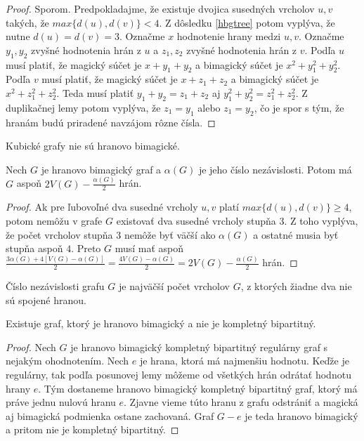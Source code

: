 \begin{proof} Sporom. Predpokladajme, že existuje dvojica susedných vrcholov $u,v$ takých, že $max \{d(u), d(v)\} < 4$. Z dôsledku \ref{hbgtree}  potom vyplýva, že nutne $d(u) = d(v) = 3$. Označme $x$ hodnotenie hrany medzi $u,v$. Označme $y_1, y_2$ zvyšné hodnotenia hrán z $u$ a $z_1, z_2$ zvyšné hodnotenia hrán z $v$. Podľa $u$ musí platiť, že magický súčet je $x + y_1 + y_2$ a bimagický súčet je $x^2 + y^2_1 + y^2_2$. Podľa $v$ musí platiť, že magický súčet je $x + z_1 + z_2$ a bimagický súčet je $x^2 + z^2_1 + z^2_2$. Teda musí platiť $y_1 + y_2 = z_1 + z_2$ aj $y^2_1 + y^2_2 = z^2_1 + z^2_2$. Z duplikačnej lemy potom vyplýva, že $z_1 = y_1$ alebo $z_1 = y_2$, čo je spor s tým, že hranám budú priradené navzájom rôzne čísla.
\end{proof} 

\begin{consequence} Kubické grafy nie sú hranovo bimagické.
\end{consequence}

\begin{consequence} Nech $G$ je hranovo bimagický graf a $\alpha (G)$ je jeho číslo nezávislosti. Potom má $G$ aspoň $2V(G) - \frac{\alpha (G)}{2}$ hrán.
\end{consequence}

\begin{proof} Ak pre ľubovoľné dva susedné vrcholy $u,v$ platí $max \{d(u), d(v)\} \geq 4$, potom nemôžu v grafe $G$ existovať dva susedné vrcholy stupňa $3$. Z toho vyplýva, že počet vrcholov stupňa $3$ nemôže byť väčší ako $\alpha (G)$ a ostatné musia byť stupňa aspoň $4$. Preto $G$ musí mať aspoň $\frac{3 \alpha (G) + 4[V(G) - \alpha (G)]}{2} = \frac{4 V(G) - \alpha(G)}{2} = 2 V(G) - \frac{\alpha (G)}{2}$ hrán.
\end{proof}

\begin{note} Číslo nezávislosti grafu $G$ je najväčší počet vrcholov $G$, z ktorých žiadne dva nie sú spojené hranou.
\end{note}

\begin{theorem} Existuje graf, ktorý je hranovo bimagický a nie je kompletný bipartitný.
\end{theorem}

\begin{proof} Nech $G$ je hranovo bimagický kompletný bipartitný regulárny graf s nejakým ohodnotením. Nech $e$ je hrana, ktorá má najmenšiu hodnotu. Keďže je regulárny, tak podľa posunovej lemy môžeme od všetkých hrán odrátať hodnotu hrany $e$. Tým dostaneme hranovo bimagický kompletný bipartitný graf, ktorý má práve jednu nulovú hranu $e$. Zjavne vieme túto hranu z grafu odstrániť a magická aj bimagická podmienka ostane zachovaná. Graf $G - e$ je teda hranovo bimagický a pritom nie je kompletný bipartitný.
\end{proof}

